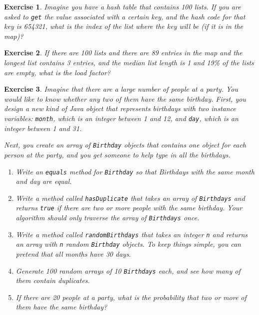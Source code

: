 \documentclass[12pt]{book}
\theoremstyle{exercise}
\newtheorem{exercise}{Exercise}[chapter]
\begin{document}
\begin{exercise}
Imagine you have a hash table that
contains 100 lists.  If you are asked to {\tt get} the value associated
with a certain key, and the hash code for that key is 654321, what is
the index of the list where the key will be (if it is in the map)?
\end{exercise}


\begin{exercise}
If there are 100 lists and there are 89 entries in the
map and the longest list contains 3 entries, and the median
list length is 1 and 19\% of the lists are empty, what is the load
factor?
\end{exercise}


\begin{exercise}
Imagine that there are a large number of people at a party.
You would like to know whether any two of them have the same
birthday.  First, you design a new kind of Java object that
represents birthdays with two instance variables:
{\tt month}, which is an integer between 1 and 12, and
{\tt day}, which is an integer between 1 and 31.

Next, you create an array of {\tt Birthday} objects that
contains one object for each person at the party, and you
get someone to help type in all the birthdays.

\begin{enumerate}

\item Write an {\tt equals} method for {\tt Birthday} so that
Birthdays with the same month and day are equal.

\item Write a method called {\tt hasDuplicate} that takes
an array of {\tt Birthdays} and returns {\tt true} if there
are two or more people with the same birthday.
Your algorithm should only traverse the array of
{\tt Birthdays} once.

\item Write a method called {\tt randomBirthdays} that takes
an integer {\tt n} and returns an array with {\tt n} random
{\tt Birthday} objects.  To keep things simple, you can pretend
that all months have 30 days.

\item Generate 100 random arrays of 10 {\tt Birthdays} each, and
see how many of them contain duplicates.

\item If there are 20 people at a party, what is the probability
that two or more of them have the same birthday?

\end{enumerate}
\end{exercise}
\end{document}
